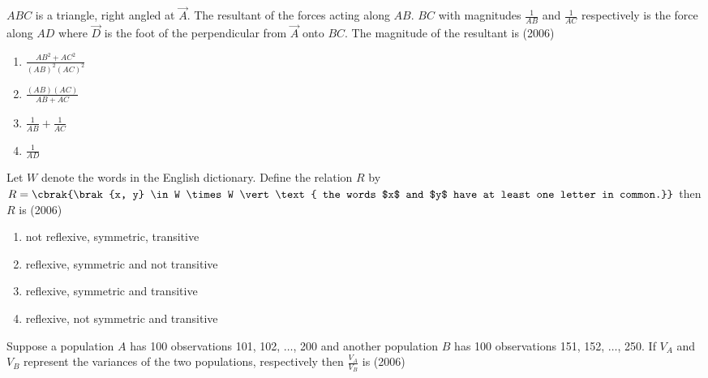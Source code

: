 \iffalse
\title{Assignment 3}
\author{AI24BTECH11031 - Shivram S}
\section{mains}
\fi

    \setcounter{enumi}{30}
    \item $ABC$ is a triangle, right angled at $\vec A$. The resultant of
        the forces acting along $AB$. $BC$ with magnitudes $\frac {1} {AB}$
        and $\frac {1} {AC}$ respectively is the force along $AD$ where
        $\vec D$ is the foot of the perpendicular from $\vec A$ onto $BC$.
        The magnitude of the resultant is
        \hfill (2006)

        \begin{multicols}{2}
            \begin{enumerate}
                \item $\frac {AB^2 + AC^2} {(AB)^2(AC)^2}$
                \item $\frac {(AB)(AC)} {AB + AC}$
                \item $\frac {1} {AB} + \frac {1} {AC}$
                \item $ \frac {1} {AD}$
            \end{enumerate}
        \end{multicols}

    \item Let $W$ denote the words in the English dictionary. Define the
        relation $R$ by $R = \cbrak{\brak{x, y} \in W \times W \vert
        \text{ the words $x$ and $y$ have at least one letter in common.}}$
        then $R$ is
        \hfill (2006)

        \begin{enumerate}
            \item not reflexive, symmetric, transitive
            \item reflexive, symmetric and not transitive
            \item reflexive, symmetric and transitive
            \item reflexive, not symmetric and transitive
        \end{enumerate}

    \item Suppose a population $A$ has 100 observations 101, 102, $\dots$, 200
        and another population $B$ has 100 observations 151, 152, $\dots$, 250.
        If $V_A$ and $V_B$ represent the variances of the two populations,
        respectively then $\frac {V_A} {V_B}$ is
        \hfill (2006)

